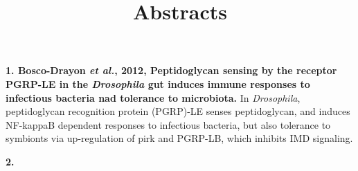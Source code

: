 \documentclass[11pt]{article}
\title{Abstracts}
\author{}
\date{}
\begin{document}
\begin{sloppypar}
  \maketitle

  \linenumbers

\textbf{1. Bosco-Drayon \textit{et al.}, 2012, Peptidoglycan sensing by the receptor PGRP-LE in the \textit{Drosophila} gut induces immune responses to infectious bacteria nad tolerance to microbiota.} \newline
In \textit{Drosophila}, peptidoglycan recognition protein (PGRP)-LE senses peptidoglycan, and induces NF-kappaB dependent responses to infectious bacteria, but also tolerance to symbionts via up-regulation of pirk and PGRP-LB, which inhibits IMD signaling.

\par

\textbf{2. }

\end{sloppypar}
\end{document}
